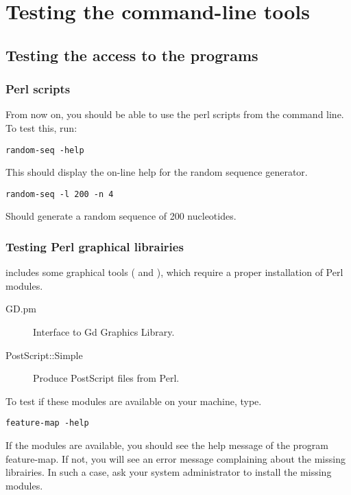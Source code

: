 \chapter{Testing the command-line tools}

\section{Testing the access to the programs}

\subsection{Perl scripts}

From now on, you should be able to use the perl scripts from the
command line. To test this, run:

\begin{lstlisting}
random-seq -help
\end{lstlisting}


This should display the on-line help for the random sequence
generator.

\begin{lstlisting}
random-seq -l 200 -n 4
\end{lstlisting}

Should generate a random sequence of 200 nucleotides.


\subsection{Testing Perl graphical librairies}

\RSAT includes some graphical tools ( and
), which require a proper installation of Perl
modules.

\begin{description}
\item[GD.pm] Interface to Gd Graphics Library.
\item[PostScript::Simple]  Produce PostScript files from Perl.
\end{description}

To test if these modules are available on your machine, type.

\begin{lstlisting}
feature-map -help
\end{lstlisting}

If the modules are available, you should see the help message of the
program feature-map. If not, you will see an error message complaining
about the missing librairies. In such a case, ask your system
administrator to install the missing modules.

